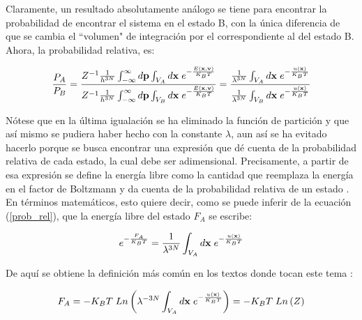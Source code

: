 \documentclass [11pt]{article}
\begin{document}
 Claramente, un resultado absolutamente análogo se tiene para encontrar la probabilidad de encontrar el sistema en el estado B, con la única diferencia de que se cambia el ``volumen" de integración por el correspondiente al del estado B. Ahora, la probabilidad relativa, es:
 
 \begin{equation}\label{prob_rel}
     \frac{P_A}{P_B}=\frac{Z^{-1} \frac{1}{h^{3N}} \int_{-\infty}^{\infty}d{\bf p}\int_{V_A}d{\bf x}{\hspace{0.1 cm}}e^{-\frac{E({\bf x},{\bf v})}{K_BT}}}{Z^{-1} \frac{1}{h^{3N}} \int_{-\infty}^{\infty}d{\bf p}\int_{V_B}d{\bf x}{\hspace{0.1 cm}}e^{-\frac{E({\bf x},{\bf v})}{K_BT}}}=\frac{\frac{1}{\lambda^{3N}}\int_{V_A}d{\bf x}{\hspace{0.1 cm}}e^{-\frac{u({\bf x})}{K_BT}}}{\frac{1}{\lambda^{3N}}\int_{V_B}d{\bf x}{\hspace{0.1 cm}}e^{-\frac{u({\bf x})}{K_BT}}}
 \end{equation}
 
 Nótese que en la última igualación se ha eliminado la función de partición y que así mismo se pudiera haber hecho con la constante $\lambda$, aun así se ha evitado hacerlo porque se busca encontrar una expresión que dé cuenta de la probabilidad relativa de cada estado, la cual debe ser adimensional. Precisamente, a partir de esa expresión se define la energía libre como la cantidad que reemplaza la energía en el factor de Boltzmann y da cuenta de la probabilidad relativa de un estado \cite{zukerman}. En términos matemáticos, esto quiere decir, como se puede inferir de la ecuación  (\ref{prob_rel}), que la energía libre del estado $F_A$ se escribe:
 
 \begin{equation}
     e^{-\frac{F_A}{K_BT}}=\frac{1}{\lambda^{3N}}\int_{V_A}d{\bf x}{\hspace{0.1 cm}}e^{-\frac{u({\bf x})}{K_BT}}
 \end{equation}
 
De aquí se obtiene la definición más común en los textos donde tocan este tema \cite{haile}:

\begin{equation}
    F_A=-K_BT\hspace{0.1 cm}Ln\left(\lambda^{-3N}\int_{V_A}d{\bf x}{\hspace{0.1 cm}}e^{-\frac{u({\bf x})}{K_BT}}\right)=-K_BT\hspace{0.1 cm}Ln\left(Z\right)
\end{equation}
\end{document}
